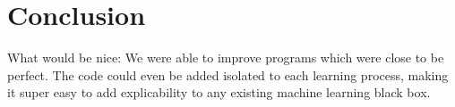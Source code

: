 \chapter{Conclusion}
What would be nice:
We were able to improve programs which were close to be perfect. The code could even be added isolated to each learning process, making it super easy to add explicability to any existing machine learning black box.